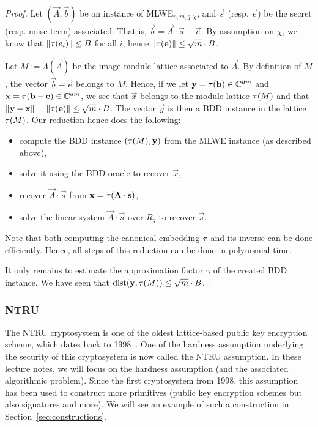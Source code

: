 \begin{proof}
Let $(\vec A, \vec b)$ be an instance of MLWE$_{n,m,q,\chi}$, and $\vec s$ (resp. $\vec e$) be the secret (resp. noise term) associated. That is, $\vec b = \vec A \cdot \vec s + \vec e$. By assumption on $\chi$, we know that $\|\tau(e_i)\| \leq B$ for all $i$, hence $\|\tau(\mathbf e)\| \leq \sqrt{m} \cdot B$.

Let $M := \Lambda(\vec A)$ be the image module-lattice associated to $\vec A$. By definition of $M$, the vector $\vec b - \vec e$ belongs to $M$. Hence, if we let $\mathbf y = \tau(\mathbf b) \in \mathbb{C}^{dm}$ and $\mathbf x = \tau(\mathbf b - \mathbf e) \in \mathbb{C}^{dm}$, we see that $\vec x$ belongs to the module lattice $\tau(M)$ and that $\|\mathbf y - \mathbf x\| = \| \tau(\mathbf e)\| \leq \sqrt{m} \cdot B$.
The vector $\vec y$ is then a BDD instance in the lattice $\tau(M)$. Our reduction hence does the following:
\begin{itemize}
\item compute the BDD instance $(\tau(M), \mathbf y)$ from the MLWE instance (as described above), 
\item solve it using the BDD oracle to recover $\vec x$, 
\item recover $\vec A \cdot \vec s$ from $\mathbf x = \tau(\mathbf A \cdot \mathbf s)$,
\item solve the linear system $\vec A \cdot \vec s$ over $R_q$ to recover $\vec s$.
\end{itemize}
Note that both computing the canonical embedding $\tau$ and its inverse can be done efficiently. Hence, all steps of this reduction can be done in polynomial time.

It only remains to estimate the approximation factor $\gamma$ of the created BDD instance. We have seen that $\operatorname{dist}(\mathbf y, \tau(M)) \leq \sqrt{m} \cdot B$. 

\color{red}{Alice: finish the proof. Requires a lower bound on $\lambda_1$, this is going to be annoying... Maybe we can reduce directly to $(m+1)$-module-SVP? (it's not tight, but easier and no need to introduce module-BDD.
Or I just remove the theorem and proof, and say informally that in can be reduced to module-BDD.}
\end{proof}


\subsubsection{NTRU}
The NTRU cryptosystem is one of the oldest lattice-based public key encryption scheme, which dates back to 1998~\cite{NTRU}. One of the hardness assumption underlying the security of this cryptosystem is now called the NTRU assumption. In these lecture notes, we will focus on the hardness assumption (and the associated algorithmic problem). Since the first cryptosystem from 1998, this assumption has been used to construct more primitives (public key encryption schemes but also signatures and more). We will see an example of such a construction in Section~\ref{sec:constructions}.

